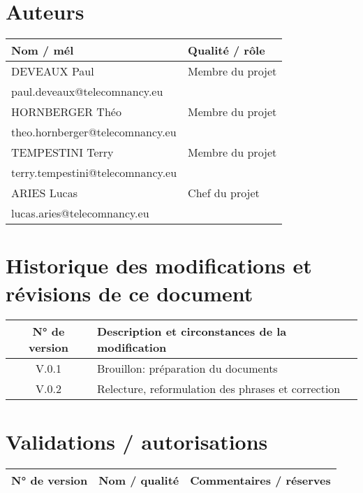 \documentclass{report}
\begin{document}
\begin{center}
    \textbf{\color{orange}{\Huge Projet PPII - Charte}}
\end{center}
\vspace{0.7cm}
\section*{\color{orange}Auteurs}
\begin{tabular}{l|p{8cm}}
   \textbf{Nom / mél} & \textbf{Qualité / rôle}  \\
   \hline 
    DEVEAUX Paul & Membre du projet  \\
    paul.deveaux@telecomnancy.eu & \\ \hline
    HORNBERGER Théo & Membre du projet \\
    theo.hornberger@telecomnancy.eu & \\ \hline
    TEMPESTINI Terry & Membre du projet \\
    terry.tempestini@telecomnancy.eu & \\ \hline
    ARIES Lucas & Chef du projet \\
    lucas.aries@telecomnancy.eu & \\ \hline
\end{tabular}

\vspace{0.5cm}

\section*{\color{orange}Historique des modifications et révisions de ce document}
\begin{tabular}{c|p{10cm}}
   \textbf{N° de version} & \textbf{Description et circonstances de la modification}  \\
   \hline 
    V.0.1 & Brouillon: préparation du documents
    \\ \hline
    V.0.2 & Relecture, reformulation des phrases et correction
\end{tabular}

\vspace{0.5cm}

\section*{\color{orange}Validations / autorisations}
\begin{tabular}{c|p{4cm}|p{6cm}}
   \textbf{N° de version} & \textbf{Nom / qualité} & \textbf{Commentaires / réserves}
    \\ \hline
\end{tabular}
\end{document}
